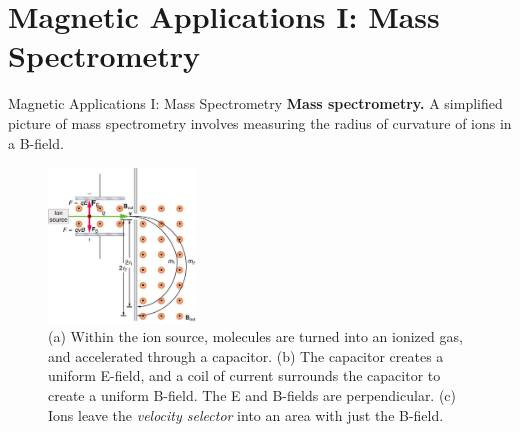 \documentclass{beamer}
\begin{document}
\section{Magnetic Applications I: Mass Spectrometry}

\begin{frame}{Magnetic Applications I: Mass Spectrometry}
\footnotesize
\textbf{\alert{Mass spectrometry.}} A simplified picture of mass spectrometry involves measuring the radius of curvature of ions in a B-field.
\begin{figure}
\centering
\includegraphics[width=0.35\textwidth]{figures/mass_spec.jpeg}
\caption{\label{fig:mass} \footnotesize (a) Within the ion source, molecules are turned into an ionized gas, and accelerated through a capacitor.  (b) The capacitor creates a uniform E-field, and a coil of current surrounds the capacitor to create a uniform B-field.  The E and B-fields are perpendicular. (c) Ions leave the \textit{velocity selector} into an area with just the B-field.}
\end{figure}
\end{frame}
\end{document}
